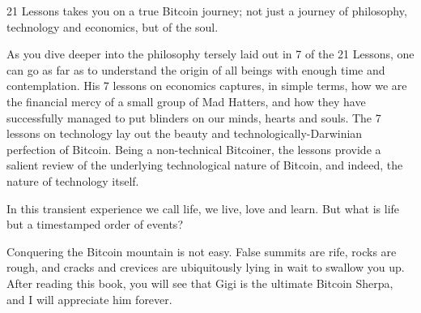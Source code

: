 21 Lessons takes you on a true Bitcoin journey; not just a journey of
philosophy, technology and economics, but of the soul.

As you dive deeper into the philosophy tersely laid out in 7 of the 21 Lessons,
one can go as far as to understand the origin of all beings with enough time and
contemplation. His 7 lessons on economics captures, in simple terms, how we are
the financial mercy of a small group of Mad Hatters, and how they have
successfully managed to put blinders on our minds, hearts and souls. The 7
lessons on technology lay out the beauty and technologically-Darwinian
perfection of Bitcoin. Being a non-technical Bitcoiner, the lessons provide a
salient review of the underlying technological nature of Bitcoin, and indeed,
the nature of technology itself.

In this transient experience we call life, we live, love and learn. But what is
life but a timestamped order of events?

Conquering the Bitcoin mountain is not easy. False summits are rife, rocks are
rough, and cracks and crevices are ubiquitously lying in wait to swallow you up.
After reading this book, you will see that Gigi is the ultimate Bitcoin Sherpa,
and I will appreciate him forever.
